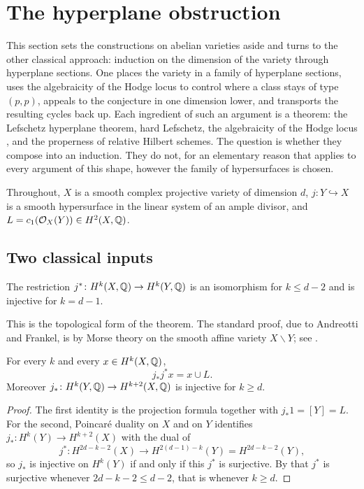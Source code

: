 \section{The hyperplane obstruction}\label{sec:hyperplane}

This section sets the constructions on abelian varieties aside and turns to
the other classical approach: induction on the dimension of the variety
through hyperplane sections. One places the variety in a family of hyperplane
sections, uses the algebraicity of the Hodge locus to control where a class
stays of type $(p,p)$, appeals to the conjecture in one dimension lower, and
transports the resulting cycles back up. Each ingredient of such
an argument is a theorem: the Lefschetz hyperplane theorem, hard Lefschetz,
the algebraicity of the Hodge locus \cite{CDK95}, and the properness of
relative Hilbert schemes. The question is whether they compose into an
induction. They do not, for an elementary reason that applies to every
argument of this shape, however the family of hypersurfaces is chosen.

Throughout, $X$ is a smooth complex projective variety of dimension $d$,
$j\colon Y\hookrightarrow X$ is a smooth hypersurface in the linear system of
an ample divisor, and $L=c_{1}(\mathcal{O}_{X}(Y))\in H^{2}(X,\mathbb{Q})$.

\subsection{Two classical inputs}

\begin{theorem}\label{thm:LHT}
The restriction $j^{*}\colon H^{k}(X,\mathbb{Q})\to H^{k}(Y,\mathbb{Q})$ is an isomorphism
for $k\le d-2$ and is injective for $k=d-1$.
\end{theorem}

This is the topological form of the theorem. The standard proof, due to
Andreotti and Frankel, is by Morse theory on the smooth affine variety
$X\smallsetminus Y$; see \cite[Chapter~1]{Voi03}.

\begin{lemma}\label{lem:gysinrestrict}
For every $k$ and every $x\in H^{k}(X,\mathbb{Q})$,
\[
  j_{*}j^{*}x=x\cup L .
\]
Moreover $j_{*}\colon H^{k}(Y,\mathbb{Q})\to H^{k+2}(X,\mathbb{Q})$ is injective for
$k\ge d$.
\end{lemma}

\begin{proof}
The first identity is the projection formula together with
$j_{*}1=[Y]=L$. For the second, Poincar\'e duality on $X$ and on $Y$
identifies $j_{*}\colon H^{k}(Y)\to H^{k+2}(X)$ with the dual of
\[
  j^{*}\colon H^{2d-k-2}(X)\longrightarrow H^{2(d-1)-k}(Y)=H^{2d-k-2}(Y),
\]
so $j_{*}$ is injective on $H^{k}(Y)$ if and only if this $j^{*}$ is
surjective. By  that $j^{*}$ is surjective whenever
$2d-k-2\le d-2$, that is whenever $k\ge d$.
\end{proof}

